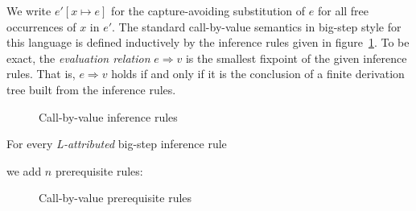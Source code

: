 \documentclass[12pt,a2paper,draft]{article}
\newcommand{\abstr}[2]{\ensuremath{\lambda{#1}.\,{#2}}}
\newcommand{\app}[2]{\ensuremath{{#1}\,{#2}}}
\newcommand{\rec}[2]{\ensuremath{{\normalfont\textsf{rec}}\,{#1}.\,{#2}}}
\begin{document}
We write $e'[x \mapsto e]$ for the capture-avoiding substitution of $e$ for all free occurrences
of $x$ in $e'$. The standard call-by-value semantics in big-step style for this language is
defined inductively by the inference rules given in figure~\ref{fig:Call_by_value_inference_rules}.
To be exact, the \emph{evaluation relation} $e \Rightarrow v$ is the smallest fixpoint of
the given inference rules. That is, $e \Rightarrow v$ holds if and only if it is the conclusion
of a finite derivation tree built from the inference rules.

\begin{figure}[htb]
  \centering
  \caption{Call-by-value inference rules}
  \label{fig:Call_by_value_inference_rules}
\end{figure}

For every \emph{L-attributed} big-step inference rule
\begin{mathpar}
\end{mathpar}
we add $n$ prerequisite rules:
\begin{mathpar}
\end{mathpar}

\begin{figure}[htb]
  \centering
  \caption{Call-by-value prerequisite rules}
  \label{fig:Call_by_value_prerequisite_rules}
\end{figure}
\end{document}
